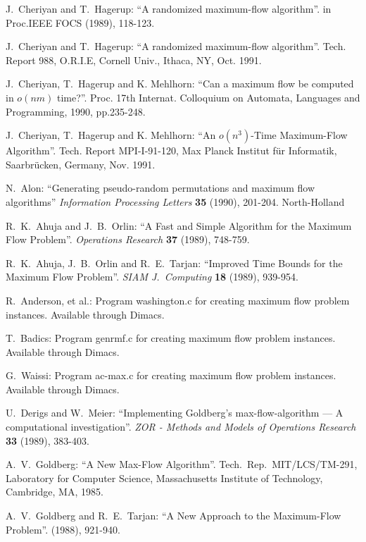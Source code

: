 \begin{thebibliography}{00}
{

J.~Cheriyan and T.~Hagerup:
``A randomized maximum-flow algorithm''.
in Proc.IEEE FOCS (1989), 118-123.

J.~Cheriyan and T.~Hagerup:
``A randomized maximum-flow algorithm''.
Tech. Report 988, O.R.I.E, Cornell Univ., Ithaca, NY, Oct. 1991.

J.~Cheriyan, T.~Hagerup and K. Mehlhorn:
``Can a maximum flow be computed in $o(nm)$ time?''.
Proc. 17th Internat. Colloquium on Automata, Languages and
Programming, 1990, pp.235-248.

J.~Cheriyan, T.~Hagerup and K. Mehlhorn:
``An $o(n^3)$-Time Maximum-Flow Algorithm''.
Tech. Report MPI-I-91-120, Max Planck Institut f\"ur Informatik,
Saarbr\"ucken, Germany, Nov. 1991.

N.~Alon:
 ``Generating pseudo-random permutations
and maximum flow algorithms''
{\sl Information Processing Letters} {\bf 35} 
(1990), 201-204. North-Holland

R.~K.~Ahuja and J.~B.~Orlin:
``A Fast and Simple Algorithm for the Maximum Flow Problem''.
{\sl Operations Research} {\bf 37} (1989), 748-759.

R.~K.~Ahuja, J.~B.~Orlin and
R.~E.~Tarjan:
``Improved Time Bounds for the Maximum Flow Problem''.
{\sl SIAM J.~Computing} {\bf 18} (1989), 939-954.

R.~Anderson, et al.:
Program washington.c for creating maximum flow problem instances.
Available through Dimacs.

T.~Badics:
Program genrmf.c for creating maximum flow problem instances.
Available through Dimacs.

G.~Waissi:
Program ac-max.c for creating maximum flow problem instances.
Available through Dimacs.

U.~Derigs and W.~Meier:
``Implementing Goldberg's max-flow-algorithm ---
A computational investigation''.
{\sl ZOR - Methods and Models of Operations Research}
{\bf 33} (1989), 383-403.

A.~V.~Goldberg:
``A New Max-Flow Algorithm''.
Tech.\ Rep.\ MIT/LCS/TM-291,
Laboratory for Computer Science,
Massachusetts Institute of Technology,
Cambridge, MA, 1985.

A.~V.~Goldberg and R.~E.~Tarjan:
``A New Approach to the Maximum-Flow Problem''.
 (1988), 921-940.

}
\end{thebibliography}
